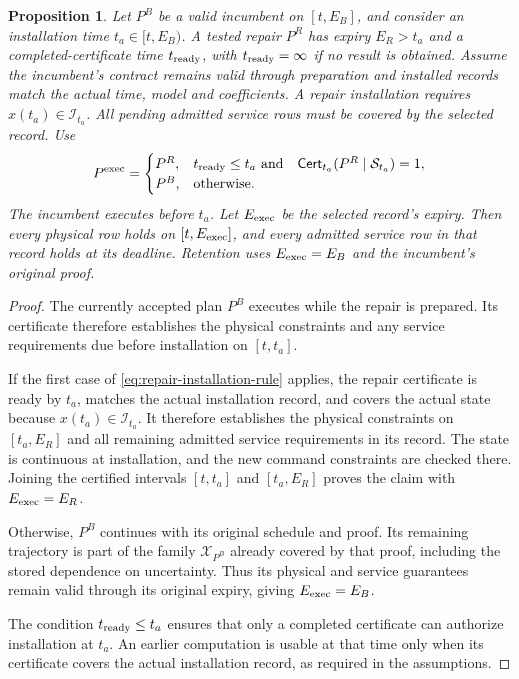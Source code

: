 \documentclass[preprint,12pt]{elsarticle}
\newtheorem{proposition}{Proposition}
\begin{document}
\begin{proposition}
\label{prop:repair-execution}
Let $P^B$ be a valid incumbent on $[t,E_B]$, and consider an
installation time $t_a\in[t,E_B)$. A tested repair $P^R$ has expiry
$E_R>t_a$ and a completed-certificate time $t_{\rm ready}$, with
$t_{\rm ready}=\infty$ if no result is obtained. Assume the incumbent's
contract remains valid through preparation and installed records match the
actual time, model and coefficients. A repair installation requires
$x(t_a)\in\mathcal I_{t_a}$. All pending admitted service rows must be
covered by the selected record. Use
\begin{equation}
P^{\rm exec}=\begin{cases}
P^R,&t_{\rm ready}\le t_a\ \text{and}\quad
 \mathsf{Cert}_{t_a}(P^R\mid\mathcal S_{t_a})=1,\\
P^B,&\text{otherwise}.
\end{cases}
\label{eq:repair-installation-rule}
\end{equation}
The incumbent executes before $t_a$. Let $E_{\rm exec}$ be the selected
record's expiry. Then every physical row holds on $[t,E_{\rm exec}]$,
and every admitted service row in that record holds at its deadline.
Retention uses $E_{\rm exec}=E_B$ and the incumbent's original proof.
\end{proposition}

\begin{proof}
The currently accepted plan $P^B$ executes while the repair is prepared.
Its certificate therefore establishes the physical constraints and any
service requirements due before installation on $[t,t_a]$.

If the first case of \eqref{eq:repair-installation-rule} applies, the
repair certificate is ready by $t_a$, matches the actual installation
record, and covers the actual state because
$x(t_a)\in\mathcal I_{t_a}$. It therefore establishes the physical
constraints on $[t_a,E_R]$ and all remaining admitted service requirements
in its record. The state is continuous at installation, and the new
command constraints are checked there. Joining the certified intervals
$[t,t_a]$ and $[t_a,E_R]$ proves the claim with $E_{\rm exec}=E_R$.

Otherwise, $P^B$ continues with its original schedule and proof. Its
remaining trajectory is part of the family $\mathcal X_{P^B}$ already
covered by that proof, including the stored dependence on uncertainty.
Thus its physical and service guarantees remain valid through its
original expiry, giving $E_{\rm exec}=E_B$.

The condition $t_{\rm ready}\le t_a$ ensures that only a completed
certificate can authorize installation at $t_a$. An earlier computation
is usable at that time only when its certificate covers the actual
installation record, as required in the assumptions.
\end{proof}
\end{document}
